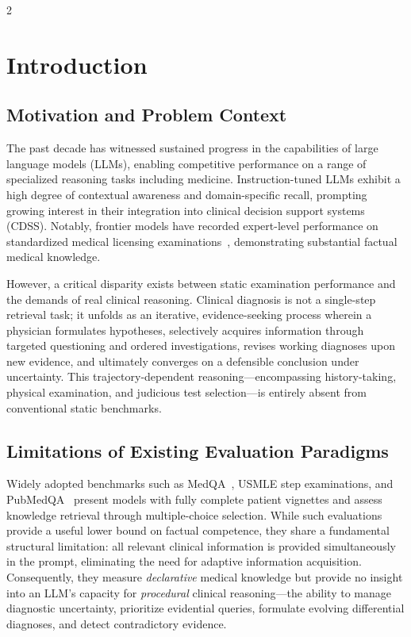 \documentclass[10pt, a4paper]{article}
\begin{document}
\begin{multicols}{2}

\section{Introduction}
\label{sec:intro}

\subsection{Motivation and Problem Context}

The past decade has witnessed sustained progress in the capabilities of large language models (LLMs), enabling competitive performance on a range of specialized reasoning tasks including medicine. Instruction-tuned LLMs exhibit a high degree of contextual awareness and domain-specific recall, prompting growing interest in their integration into clinical decision support systems (CDSS). Notably, frontier models have recorded expert-level performance on standardized medical licensing examinations~\cite{singhal2023large,nori2023capabilities}, demonstrating substantial factual medical knowledge.

However, a critical disparity exists between static examination performance and the demands of real clinical reasoning. Clinical diagnosis is not a single-step retrieval task; it unfolds as an iterative, evidence-seeking process wherein a physician formulates hypotheses, selectively acquires information through targeted questioning and ordered investigations, revises working diagnoses upon new evidence, and ultimately converges on a defensible conclusion under uncertainty. This trajectory-dependent reasoning—encompassing history-taking, physical examination, and judicious test selection—is entirely absent from conventional static benchmarks.

\subsection{Limitations of Existing Evaluation Paradigms}

Widely adopted benchmarks such as MedQA~\cite{jin2021disease}, USMLE step examinations, and PubMedQA~\cite{jin2019pubmedqa} present models with fully complete patient vignettes and assess knowledge retrieval through multiple-choice selection. While such evaluations provide a useful lower bound on factual competence, they share a fundamental structural limitation: all relevant clinical information is provided simultaneously in the prompt, eliminating the need for adaptive information acquisition. Consequently, they measure \textit{declarative} medical knowledge but provide no insight into an LLM's capacity for \textit{procedural} clinical reasoning—the ability to manage diagnostic uncertainty, prioritize evidential queries, formulate evolving differential diagnoses, and detect contradictory evidence.


\end{multicols}
\end{document}
